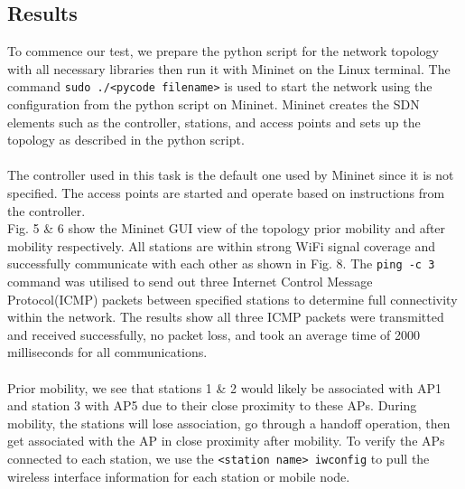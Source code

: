 \documentclass{article}
\begin{document}
\subsection{Results}
To commence our test, we prepare the python script for the network topology with all necessary libraries then run it with Mininet on the Linux terminal. The command \texttt{sudo ./<pycode filename>} is used to start the network using the configuration from the python script on Mininet. Mininet creates the SDN elements such as the controller, stations, and access points and sets up the topology as described in the python script. \\\\ The controller used in this task is the default one used by Mininet since it is not specified. The access points are started and operate based on instructions from the controller. \\ Fig. 5 \& 6 show the Mininet GUI view of the topology prior mobility and after mobility respectively. All stations are within strong WiFi signal coverage and successfully communicate with each other as shown in Fig. 8. The \texttt{ping -c 3} command was utilised to send out three Internet Control Message Protocol(ICMP) packets between specified stations to determine full connectivity within the network. The results show all three ICMP packets were transmitted and received successfully, no packet loss, and took an average time of 2000 milliseconds for all communications. \\\\ Prior mobility, we see that stations 1 \& 2 would likely be associated with AP1 and station 3 with AP5 due to their close proximity to these APs. During mobility, the stations will lose association, go through a handoff operation, then get associated with the AP in close proximity after mobility. To verify the APs connected to each station, we use the \texttt{<station name> iwconfig} to pull the wireless interface information for each station or mobile node.
\end{document}
